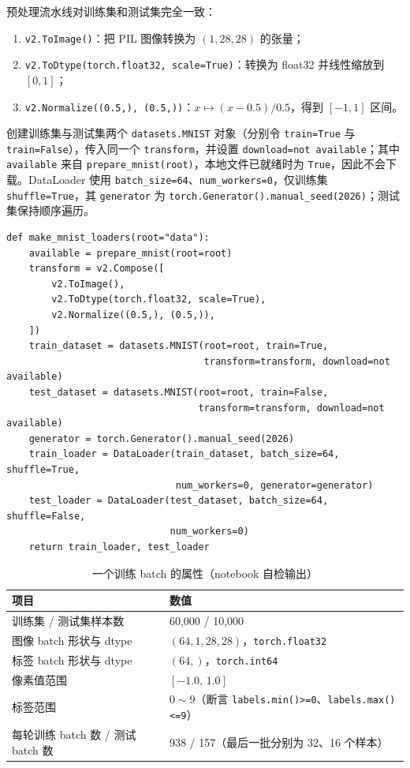 \documentclass[11pt,a4paper]{ctexart}
\begin{document}
预处理流水线对训练集和测试集完全一致：
\begin{enumerate}[itemsep=0pt,topsep=2pt]
\item \texttt{v2.ToImage()}：把 PIL 图像转换为 $(1,28,28)$ 的张量；
\item \texttt{v2.ToDtype(torch.float32, scale=True)}：转换为 float32 并线性缩放到 $[0,1]$；
\item \texttt{v2.Normalize((0.5,), (0.5,))}：$x\mapsto (x-0.5)/0.5$，得到 $[-1,1]$ 区间。
\end{enumerate}

创建训练集与测试集两个 \texttt{datasets.MNIST} 对象（分别令 \texttt{train=True} 与 \texttt{train=False}），传入同一个 \texttt{transform}，并设置 \texttt{download=not available}；其中 \texttt{available} 来自 \texttt{prepare\_mnist(root)}，本地文件已就绪时为 \texttt{True}，因此不会下载。DataLoader 使用 \texttt{batch\_size=64}、\texttt{num\_workers=0}，仅训练集 \texttt{shuffle=True}，其 \texttt{generator} 为 \texttt{torch.Generator().manual\_seed(2026)}；测试集保持顺序遍历。

\begin{lstlisting}
def make_mnist_loaders(root="data"):
    available = prepare_mnist(root=root)
    transform = v2.Compose([
        v2.ToImage(),
        v2.ToDtype(torch.float32, scale=True),
        v2.Normalize((0.5,), (0.5,)),
    ])
    train_dataset = datasets.MNIST(root=root, train=True,
                                   transform=transform, download=not available)
    test_dataset = datasets.MNIST(root=root, train=False,
                                  transform=transform, download=not available)
    generator = torch.Generator().manual_seed(2026)
    train_loader = DataLoader(train_dataset, batch_size=64, shuffle=True,
                              num_workers=0, generator=generator)
    test_loader = DataLoader(test_dataset, batch_size=64, shuffle=False,
                             num_workers=0)
    return train_loader, test_loader
\end{lstlisting}

\begin{table}[H]
\centering
\caption{一个训练 batch 的属性（notebook 自检输出）}
\label{tab:batch}
\begin{tabular}{p{6.2cm}p{9.2cm}}
\toprule
项目 & 数值 \\
\midrule
训练集 / 测试集样本数 & 60{,}000 / 10{,}000 \\
图像 batch 形状与 dtype & $(64,1,28,28)$，\texttt{torch.float32} \\
标签 batch 形状与 dtype & $(64,)$，\texttt{torch.int64} \\
像素值范围 & $[-1.0,\,1.0]$ \\
标签范围 & $0\sim 9$（断言 \texttt{labels.min()>=0}、\texttt{labels.max()<=9}） \\
每轮训练 batch 数 / 测试 batch 数 & 938 / 157（最后一批分别为 32、16 个样本） \\
\bottomrule
\end{tabular}
\end{table}
\end{document}
